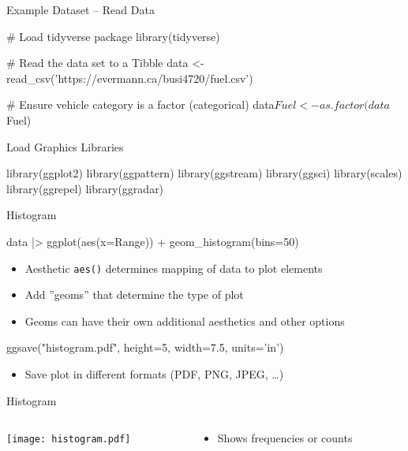 \documentclass[ignorenonframetext,xcolor=x11names]{beamer}
\begin{document}
\begin{frame}[fragile]{Example Dataset -- Read Data}
\begin{Rcode}
# Load tidyverse package
library(tidyverse)

# Read the data set to a Tibble
data <- read_csv('https://evermann.ca/busi4720/fuel.csv')

# Ensure vehicle category is a factor (categorical)
data$Fuel <- as.factor(data$Fuel)
\end{Rcode}
\end{frame}

\begin{frame}[fragile]{Load Graphics Libraries}
\small
\begin{Rcode}
library(ggplot2)
library(ggpattern)
library(ggstream)
library(ggsci)
library(scales)
library(ggrepel)
library(ggradar)
\end{Rcode}
\end{frame}

\begin{frame}[fragile]{Histogram}

\begin{Rcode}
data |> 
  ggplot(aes(x=Range)) + 
    geom_histogram(bins=50)
\end{Rcode}

\begin{itemize}
  \item Aesthetic \texttt{aes()} determines mapping of data to plot elements
  \item Add ''geoms'' that determine the type of plot
  \item Geoms can have their own additional aesthetics and other options
\end{itemize}

\begin{Rcode}
ggsave("histogram.pdf", height=5, width=7.5, units='in')
\end{Rcode}

\begin{itemize}
  \item Save plot in different formats (PDF, PNG, JPEG, \ldots)
\end{itemize}
\end{frame}

\begin{frame}{Histogram}
\begin{columns}
\begin{column}{.75\textwidth}
  \texttt{[image: histogram.pdf]}
\end{column}
\begin{column}{.35\textwidth}
\footnotesize
\begin{itemize}
\item Shows frequencies or counts
\end{itemize}
\end{column}
\end{columns}
\end{frame}
\end{document}

